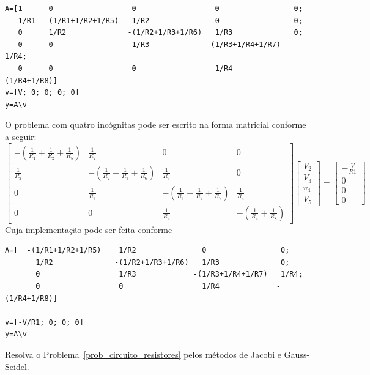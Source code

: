 \begin{resp}
\begin{verbatim}
A=[1      0                  0                  0                 0;
   1/R1  -(1/R1+1/R2+1/R5)   1/R2               0                 0;
   0      1/R2              -(1/R2+1/R3+1/R6)   1/R3              0;
   0      0                  1/R3             -(1/R3+1/R4+1/R7)   1/R4;
   0      0                  0                  1/R4             -(1/R4+1/R8)]
v=[V; 0; 0; 0; 0]
y=A\v
\end{verbatim}
O problema com quatro incógnitas pode ser escrito na forma matricial conforme a seguir:
$$\left[\begin{array}{cccc}
-\left(\frac{1}{R_1}+\frac{1}{R_2}+\frac{1}{R_5}\right)&\frac{1}{R_2}&0&0\\[.5cm]
\frac{1}{R_2}&-\left(\frac{1}{R_2}+\frac{1}{R_3}+\frac{1}{R_6}\right)&\frac{1}{R_3}&0\\[.5cm]
0&\frac{1}{R_3}&-\left(\frac{1}{R_3}+\frac{1}{R_4}+\frac{1}{R_7}\right)&\frac{1}{R_4}\\[.5cm]
0&0&\frac{1}{R_4}&-\left(\frac{1}{R_4}+\frac{1}{R_8}\right)
\end{array}
\right]
\left[\begin{array}{c}
V_2\\[.65cm]
V_3\\[.65cm]
v_4\\[.65cm]
V_5
\end{array}
\right]=
\left[\begin{array}{c}
-\frac{V}{R1}\\[.65cm]
0\\[.65cm]
0\\[.65cm]
0
\end{array}
\right] $$
Cuja implementação pode ser feita conforme
\begin{verbatim}
A=[  -(1/R1+1/R2+1/R5)    1/R2               0                 0;
       1/R2              -(1/R2+1/R3+1/R6)   1/R3              0;
       0                  1/R3             -(1/R3+1/R4+1/R7)   1/R4;
       0                  0                  1/R4             -(1/R4+1/R8)]

v=[-V/R1; 0; 0; 0]
y=A\v
\end{verbatim}
\end{resp}
\fi

\begin{exer} Resolva o Problema~\ref{prob_circuito_resistores} pelos métodos de Jacobi e Gauss-Seidel.
\end{exer}


